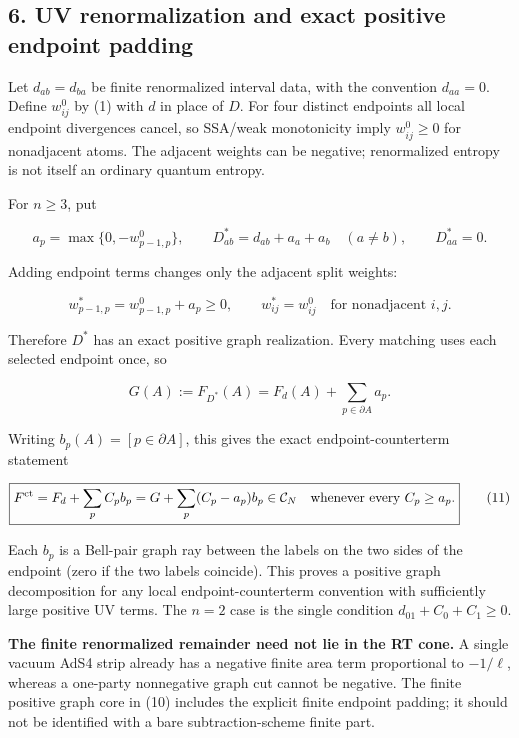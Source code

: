 \documentclass[11pt]{article}
\begin{document}
\subsection{6. UV renormalization and exact positive endpoint
padding}\label{uv-renormalization-and-exact-positive-endpoint-padding}

Let \(d_{ab}=d_{ba}\) be finite renormalized interval data, with the
convention \(d_{aa}=0\). Define \(w^0_{ij}\) by (1) with \(d\) in place
of \(D\). For four distinct endpoints all local endpoint divergences
cancel, so SSA/weak monotonicity imply \(w^0_{ij}\geq0\) for nonadjacent
atoms. The adjacent weights can be negative; renormalized entropy is not
itself an ordinary quantum entropy.

For \(n\geq3\), put

\[
a_p=\max\{0,-w^0_{p-1,p}\},\qquad
D^*_{ab}=d_{ab}+a_a+a_b\quad(a\ne b),\qquad D^*_{aa}=0.        \tag{8}
\]

Adding endpoint terms changes only the adjacent split weights:

\[
w^*_{p-1,p}=w^0_{p-1,p}+a_p\geq0,
\qquad w^*_{ij}=w^0_{ij}\quad\text{for nonadjacent }i,j.       \tag{9}
\]

Therefore \(D^*\) has an exact positive graph realization. Every
matching uses each selected endpoint once, so

\[
G(A):=F_{D^*}(A)=F_d(A)+\sum_{p\in\partial A}a_p.             \tag{10}
\]

Writing \(b_p(A)=[p\in\partial A]\), this gives the exact
endpoint-counterterm statement

\[
\boxed{
F^{\rm ct}=F_d+\sum_p C_p b_p
=G+\sum_p(C_p-a_p)b_p\in\mathcal C_N
\quad\text{whenever every }C_p\geq a_p.
}                                                            \tag{11}
\]

Each \(b_p\) is a Bell-pair graph ray between the labels on the two
sides of the endpoint (zero if the two labels coincide). This proves a
positive graph decomposition for any local endpoint-counterterm
convention with sufficiently large positive UV terms. The \(n=2\) case
is the single condition \(d_{01}+C_0+C_1\geq0\).

\textbf{The finite renormalized remainder need not lie in the RT cone.}
A single vacuum AdS4 strip already has a negative finite area term
proportional to \(-1/\ell\), whereas a one-party nonnegative graph cut
cannot be negative. The finite positive graph core in (10) includes the
explicit finite endpoint padding; it should not be identified with a
bare subtraction-scheme finite part.
\end{document}
